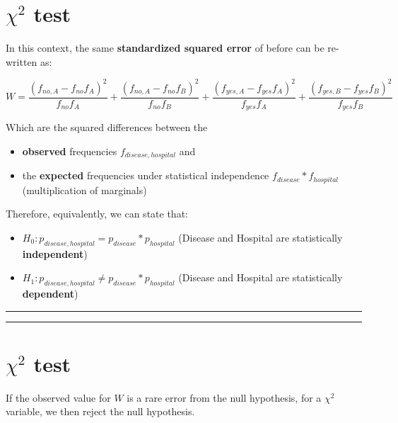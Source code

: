 \documentclass[
]{book}
\providecommand{\tightlist}{%
  \setlength{\itemsep}{0pt}\setlength{\parskip}{0pt}}
\begin{document}
\hypertarget{chi2-test-2}{%
\section{\texorpdfstring{\(\chi^2\) test}{\textbackslash chi\^{}2 test}}\label{chi2-test-2}}

In this context, the same \textbf{standardized squared error} of before can be re-written as:

\[W= \frac{(f_{no,A}-f_{no}f_{A})^2}{f_{no}f_{A}}+\frac{(f_{no,A}-f_{no}f_{B})^2}{f_{no}f_{B}}+\frac{(f_{yes,A}-f_{yes}f_{A})^2}{f_{yes}f_{A}}+\frac{(f_{yes,B}-f_{yes}f_{B})^2}{f_{yes}f_{B}}\]

Which are the squared differences between the

\begin{itemize}
\tightlist
\item
  \textbf{observed} frequencies \(f_{disease, hospital}\) and
\item
  the \textbf{expected} frequencies under statistical independence \(f_{disease}*f_{hospital}\) (multiplication of marginals)
\end{itemize}

Therefore, equivalently, we can state that:

\begin{itemize}
\tightlist
\item
  \(H_0:p_{disease, hospital}=p_{disease}*p_{hospital}\) (Disease and Hospital are statistically \textbf{independent})
\item
  \(H_1:p_{disease, hospital}\neq p_{disease}*p_{hospital}\)
  (Disease and Hospital are statistically \textbf{dependent})
\end{itemize}

\begin{center}\rule{0.5\linewidth}{0.5pt}\end{center}

\begin{center}\rule{0.5\linewidth}{0.5pt}\end{center}

\hypertarget{chi2-test-3}{%
\section{\texorpdfstring{\(\chi^2\) test}{\textbackslash chi\^{}2 test}}\label{chi2-test-3}}

If the observed value for \(W\) is a rare error from the null hypothesis, for a \(\chi^2\) variable, we then reject the null hypothesis.
\end{document}
